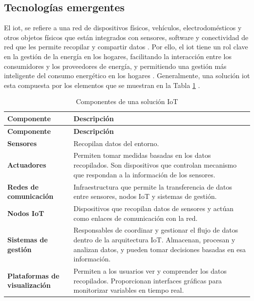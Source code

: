 \documentclass[11pt,a4paper]{book}
\begin{document}
\subsection{Tecnologías emergentes}
El \gls{iot}, se refiere a una red de dispositivos físicos, vehículos, electrodomésticos y otros objetos físicos que están integrados con sensores, software y conectividad de red que les permite recopilar y compartir datos \cite{IBMIoT2025}. Por ello, el \gls{iot}  tiene un rol clave en la gestión de la energía en los hogares, facilitando la interacción entre los consumidores y los proveedores de energía, y permitiendo una gestión más inteligente del consumo energético en los hogares \cite{ioT2023}. Generalmente, una solución \gls{iot} esta compuesta por los elementos que se muestran en la Tabla \ref{tab:componentes_iot} \cite{dominguez2022overview}.

\renewcommand{\arraystretch}{1.2} %
\begin{longtable}{|p{4cm}|p{8cm}|}
    \caption{Componentes de una solución IoT} \label{tab:componentes_iot} \\
    \hline
    \textbf{Componente} & \textbf{Descripción} \\
    \hline
    \endfirsthead

    \hline
    \textbf{Componente} & \textbf{Descripción} \\
    \hline
    \endhead

    \hline
    \endfoot

    \hline
    \endlastfoot

    \textbf{Sensores} & Recopilan datos del entorno. \\
    \hline
    \textbf{Actuadores} & Permiten tomar medidas basadas en los datos recopilados. Son dispositivos que controlan mecanismo que respondan a la información de los sensores. \\
    \hline
    \textbf{Redes de comunicación} & Infraestructura que permite la transferencia de datos entre sensores, nodos IoT y sistemas de gestión. \\
    \hline
    \textbf{Nodos IoT} & Dispositivos que recopilan datos de sensores y actúan como enlaces de comunicación con la red. \\
    \hline
    \textbf{Sistemas de gestión} & Responsables de coordinar y gestionar el flujo de datos dentro de la arquitectura IoT. Almacenan, procesan y analizan datos, y pueden tomar decisiones basadas en esa información. \\
    \hline
    \textbf{Plataformas de visualización} & Permiten a los usuarios ver y comprender los datos recopilados. Proporcionan interfaces gráficas para monitorizar variables en tiempo real. \\
    \hline
\end{longtable}
\end{document}
